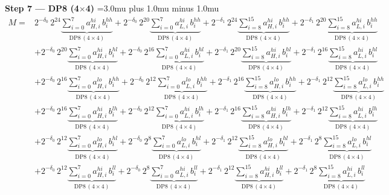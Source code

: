 \documentclass[fleqn]{article}
\newcommand{\DPop}[3]{\mathrm{DP#1}\,(#2\!\times\!#3)}
\begin{document}
\textbf{Step 7 --- DP8 (4$\times$4)}
{\medmuskip=3.0mu plus 1.0mu minus 1.0mu
\begin{align*}
M = {}
  & 2^{-\delta_0}\,2^{24}\underbrace{\sum_{i=0}^{7} a_{H,i}^{hi}\, b_i^{hh}}_{\DPop{8}{4}{4}}
  + 2^{-\delta_0}\,2^{20}\underbrace{\sum_{i=0}^{7} a_{L,i}^{hi}\, b_i^{hh}}_{\DPop{8}{4}{4}}
  + 2^{-\delta_1}\,2^{24}\underbrace{\sum_{i=8}^{15} a_{H,i}^{hi}\, b_i^{hh}}_{\DPop{8}{4}{4}}
  + 2^{-\delta_1}\,2^{20}\underbrace{\sum_{i=8}^{15} a_{L,i}^{hi}\, b_i^{hh}}_{\DPop{8}{4}{4}} \\[1em]
  & + 2^{-\delta_0}\,2^{20}\underbrace{\sum_{i=0}^{7} a_{H,i}^{hi}\, b_i^{hl}}_{\DPop{8}{4}{4}}
  + 2^{-\delta_0}\,2^{16}\underbrace{\sum_{i=0}^{7} a_{L,i}^{hi}\, b_i^{hl}}_{\DPop{8}{4}{4}}
  + 2^{-\delta_1}\,2^{20}\underbrace{\sum_{i=8}^{15} a_{H,i}^{hi}\, b_i^{hl}}_{\DPop{8}{4}{4}}
  + 2^{-\delta_1}\,2^{16}\underbrace{\sum_{i=8}^{15} a_{L,i}^{hi}\, b_i^{hl}}_{\DPop{8}{4}{4}} \\[1em]
  & + 2^{-\delta_0}\,2^{16}\underbrace{\sum_{i=0}^{7} a_{H,i}^{lo}\, b_i^{hh}}_{\DPop{8}{4}{4}}
  + 2^{-\delta_0}\,2^{12}\underbrace{\sum_{i=0}^{7} a_{L,i}^{lo}\, b_i^{hh}}_{\DPop{8}{4}{4}}
  + 2^{-\delta_1}\,2^{16}\underbrace{\sum_{i=8}^{15} a_{H,i}^{lo}\, b_i^{hh}}_{\DPop{8}{4}{4}}
  + 2^{-\delta_1}\,2^{12}\underbrace{\sum_{i=8}^{15} a_{L,i}^{lo}\, b_i^{hh}}_{\DPop{8}{4}{4}} \\[1em]
  & + 2^{-\delta_0}\,2^{16}\underbrace{\sum_{i=0}^{7} a_{H,i}^{hi}\, b_i^{lh}}_{\DPop{8}{4}{4}}
  + 2^{-\delta_0}\,2^{12}\underbrace{\sum_{i=0}^{7} a_{L,i}^{hi}\, b_i^{lh}}_{\DPop{8}{4}{4}}
  + 2^{-\delta_1}\,2^{16}\underbrace{\sum_{i=8}^{15} a_{H,i}^{hi}\, b_i^{lh}}_{\DPop{8}{4}{4}}
  + 2^{-\delta_1}\,2^{12}\underbrace{\sum_{i=8}^{15} a_{L,i}^{hi}\, b_i^{lh}}_{\DPop{8}{4}{4}} \\[1em]
  & + 2^{-\delta_0}\,2^{12}\underbrace{\sum_{i=0}^{7} a_{H,i}^{lo}\, b_i^{hl}}_{\DPop{8}{4}{4}}
  + 2^{-\delta_0}\,2^{8}\underbrace{\sum_{i=0}^{7} a_{L,i}^{lo}\, b_i^{hl}}_{\DPop{8}{4}{4}}
  + 2^{-\delta_1}\,2^{12}\underbrace{\sum_{i=8}^{15} a_{H,i}^{lo}\, b_i^{hl}}_{\DPop{8}{4}{4}}
  + 2^{-\delta_1}\,2^{8}\underbrace{\sum_{i=8}^{15} a_{L,i}^{lo}\, b_i^{hl}}_{\DPop{8}{4}{4}} \\[1em]
  & + 2^{-\delta_0}\,2^{12}\underbrace{\sum_{i=0}^{7} a_{H,i}^{hi}\, b_i^{ll}}_{\DPop{8}{4}{4}}
  + 2^{-\delta_0}\,2^{8}\underbrace{\sum_{i=0}^{7} a_{L,i}^{hi}\, b_i^{ll}}_{\DPop{8}{4}{4}}
  + 2^{-\delta_1}\,2^{12}\underbrace{\sum_{i=8}^{15} a_{H,i}^{hi}\, b_i^{ll}}_{\DPop{8}{4}{4}}
  + 2^{-\delta_1}\,2^{8}\underbrace{\sum_{i=8}^{15} a_{L,i}^{hi}\, b_i^{ll}}_{\DPop{8}{4}{4}} \\[1em]

\end{align*}}
\end{document}
